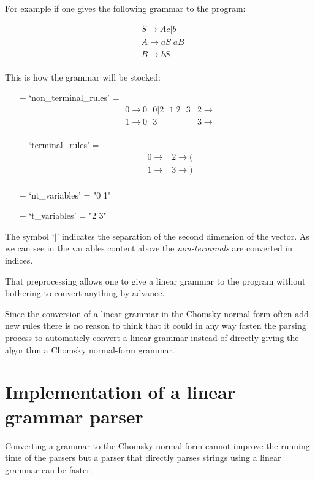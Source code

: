 For example if one gives the following grammar to the program:

\begin{align*}
    &S \to Ac | b\\
    &A \to aS | aB\\
    &B \to bS\\
\end{align*}

This is how the grammar will be stocked:

\begin{itemize}
    \item[$-$] `non\_terminal\_rules' =
        \begin{align*}
            &0 \to 0\text{ }0 | 2\text{ }1 | 2\text{ }3 &2 \to\\
            &1 \to 0\text{ }3                           &3 \to\\
        \end{align*}
    \item[$-$] `terminal\_rules' =
        \begin{align*}
            &0 \to  &2 \to (\\
            &1 \to  &3 \to )\\
        \end{align*}
    \item[$-$] `nt\_variables' = "0 1"
    \item[$-$] `t\_variables' = "2 3"
\end{itemize}

The symbol `$|$' indicates the separation of the second dimension of the vector.
As we can see in the variables content above the \textit{non-terminals} are converted in indices.

That preprocessing allows one to give a linear grammar to the program without bothering to convert anything by advance.

Since the conversion of a linear grammar in the Chomsky normal-form often add new rules there is no reason to think that it could in any way fasten the parsing process to automaticly convert a linear grammar instead of directly giving the algorithm a Chomsky normal-form grammar.

\section{Implementation of a linear grammar parser}

Converting a grammar to the Chomsky normal-form cannot improve the running time of the parsers but a parser that directly parses strings using a linear grammar can be faster.

